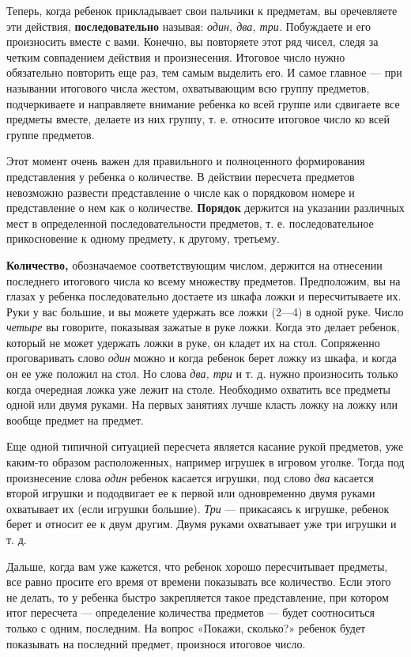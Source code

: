 \documentclass{book}
\renewcommand{\emph}[1]{\textit{#1}}
\begin{document}
Теперь, когда ребенок прикладывает свои пальчики к предметам, вы
оречевляете эти действия, \textbf{последовательно} называя: \emph{один,
два, три.} Побуждаете и его произносить вместе с вами. Конечно, вы
повторяете этот ряд чисел, следя за четким совпадением действия и
произнесения. Итоговое число нужно обязательно повторить еще раз, тем
самым выделить его. И самое главное --- при назывании итогового числа
жестом, охватывающим всю группу предметов, подчеркиваете и направляете
внимание ребенка ко всей группе или сдвигаете все предметы вместе,
делаете из них группу, т. е. относите итоговое число ко всей группе
предметов.

Этот момент очень важен для правильного и полноценного формирования
представления у ребенка о количестве. В действии пересчета предметов
невозможно развести представление о числе как о порядковом номере и
представление о нем как о количестве. \textbf{Порядок} держится на
указании различных мест в определенной последовательности предметов, т.
е. последовательное прикосновение к одному предмету, к другому,
третьему.

\textbf{Количество,} обозначаемое соответствующим числом, держится на
отнесении последнего итогового числа ко всему множеству предметов.
Предположим, вы на глазах у ребенка последовательно достаете из шкафа
ложки и пересчитываете их. Руки у вас большие, и вы можете удержать все
ложки (2---4) в одной руке. Число \emph{четыре} вы говорите, показывая
зажатые в руке ложки. Когда это делает ребенок, который не может
удержать ложки в руке, он кладет их на стол. Сопряженно проговаривать
слово \emph{один} можно и когда ребенок берет ложку из шкафа, и когда он
ее уже положил на стол. Но слова \emph{два, три} и т. д. нужно
произносить только когда очередная ложка уже лежит на столе. Необходимо
охватить все предметы одной или двумя руками. На первых занятиях лучше
класть ложку на ложку или вообще предмет на предмет.

Еще одной типичной ситуацией пересчета является касание рукой предметов,
уже каким-то образом расположенных, например игрушек в игровом уголке.
Тогда под произнесение слова \emph{один} ребенок касается игрушки, под
слово \emph{два} касается второй игрушки и пододвигает ее к первой или
одновременно двумя руками охватывает их (если игрушки большие).
\emph{Три} --- прикасаясь к игрушке, ребенок берет и относит ее к двум
другим. Двумя руками охватывает уже три игрушки и т. д.

Дальше, когда вам уже кажется, что ребенок хорошо пересчитывает
предметы, все равно просите его время от времени показывать все
количество. Если этого не делать, то у ребенка быстро закрепляется такое
представление, при котором итог пересчета --- определение количества
предметов --- будет соотноситься только с одним, последним. На вопрос
«Покажи, сколько?» ребенок будет показывать на последний предмет,
произнося итоговое число.
\end{document}
